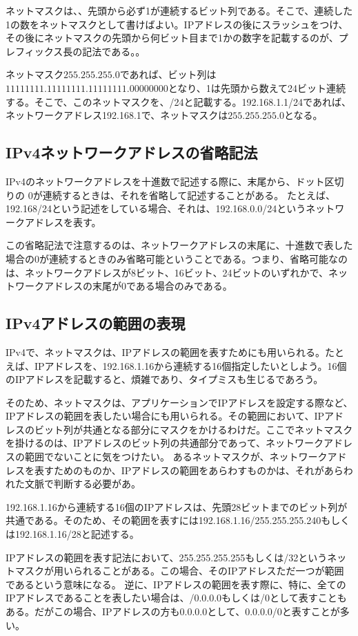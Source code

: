 ネットマスクは、、先頭から必ず1が連続するビット列である。そこで、連続した1の数をネットマスクとして書けばよい。IPアドレスの後にスラッシュをつけ、その後にネットマスクの先頭から何ビット目まで1かの数字を記載するのが、プレフィックス長の記法である。。

ネットマスク$255.255.255.0$であれば、ビット列は$11111111.11111111.11111111.00000000$となり、1は先頭から数えて24ビット連続する。そこで、このネットマスクを、/24と記載する。192.168.1.1/24であれば、ネットワークアドレス192.168.1で、ネットマスクは$255.255.255.0$となる。

\subsection{IPv4ネットワークアドレスの省略記法}
IPv4のネットワークアドレスを十進数で記述する際に、末尾から、ドット区切りの
0が連続するときは、それを省略して記述することがある。
たとえば、192.168/24という記述をしている場合、それは、192.168.0.0/24というネットワークアドレスを表す。

この省略記法で注意するのは、ネットワークアドレスの末尾に、十進数で表した場合の0が連続するときのみ省略可能ということである。つまり、省略可能なのは、ネットワークアドレスが8ビット、16ビット、24ビットのいずれかで、ネットワークアドレスの末尾が0である場合のみである。



\subsection{IPv4アドレスの範囲の表現}
IPv4で、ネットマスクは、IPアドレスの範囲を表すためにも用いられる。たとえば、IPアドレスを、192.168.1.16から連続する16個指定したいとしよう。16個のIPアドレスを記載すると、煩雑であり、タイプミスも生じるであろう。

そのため、ネットマスクは、アプリケーションでIPアドレスを設定する際など、IPアドレスの範囲を表したい場合にも用いられる。その範囲において、IPアドレスのビット列が共通となる部分にマスクをかけるわけだ。ここでネットマスクを掛けるのは、IPアドレスのビット列の共通部分であって、ネットワークアドレスの範囲でないことに気をつけたい。
あるネットマスクが、ネットワークアドレスを表すためのものか、IPアドレスの範囲をあらわすものかは、それがあらわれた文脈で判断する必要があ。

192.168.1.16から連続する16個のIPアドレスは、先頭28ビットまでのビット列が共通である。そのため、その範囲を表すには192.168.1.16/255.255.255.240もしくは192.168.1.16/28と記述する。

IPアドレスの範囲を表す記法において、255.255.255.255もしくは/32というネットマスクが用いられることがある。この場合、そのIPアドレスただ一つが範囲であるという意味になる。
逆に、IPアドレスの範囲を表す際に、特に、全てのIPアドレスであることを表したい場合は、/0.0.0.0もしくは/0として表すこともある。だがこの場合、IPアドレスの方も0.0.0.0として、0.0.0.0/0と表すことが多い。

